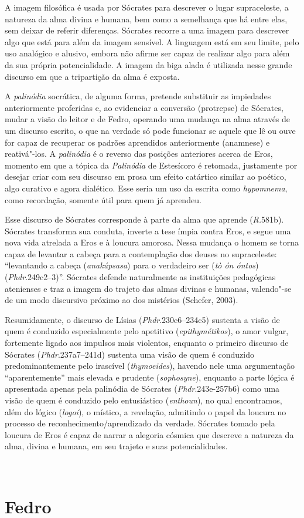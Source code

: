 A imagem filosófica é usada por Sócrates para descrever o lugar
supraceleste, a natureza da alma divina e humana, bem como a semelhança
que há entre elas, sem deixar de referir diferenças. Sócrates recorre a
uma imagem para descrever algo que está para além da imagem sensível. A linguagem está em seu limite, pelo uso analógico e alusivo, embora não
afirme ser capaz de realizar algo para além da sua própria
potencialidade. A imagem da biga alada é utilizada nesse grande discurso
em que a tripartição da alma é exposta.

A \emph{palinódia} socrática, de alguma forma, pretende substituir as
impiedades anteriormente proferidas e, ao evidenciar a conversão
(protrepse) de Sócrates, mudar a visão do leitor e de Fedro, operando
uma mudança na alma através de um discurso escrito, o que na verdade só
pode funcionar se aquele que lê ou ouve for capaz de recuperar os
padrões aprendidos anteriormente (anamnese) e reativá"-los.
A \emph{palinódia} é o reverso das posições anteriores acerca de Eros,
momento em que a tópica da \emph{Palinódia} de Estesícoro é retomada,
justamente por desejar criar com seu discurso em prosa um efeito
catártico similar ao poético, algo curativo e agora dialético. Esse
seria um uso da escrita como \emph{hypomnema}, como recordação, somente
útil para quem já aprendeu.

Esse discurso de Sócrates corresponde à parte da alma que aprende
(\emph{R.}581b). Sócrates transforma sua conduta, inverte a tese ímpia
contra Eros, e segue uma nova vida atrelada a Eros e à loucura amorosa.
Nessa mudança o homem se torna capaz de levantar a cabeça para a
contemplação dos deuses no supraceleste: ``levantando a cabeça
(\emph{anakúpsasa}) para o verdadeiro ser (\emph{tò ón óntos})
(\emph{Phdr}.249c2--3)''. Sócrates defende naturalmente as instituições
pedagógicas atenienses e traz a imagem do trajeto das almas divinas e
humanas, valendo"-se de um modo discursivo próximo ao dos mistérios
(Schefer, 2003).

 

\asterisc{}

 

Resumidamente, o discurso de Lísias (\emph{Phdr}.230e6--234c5) sustenta
a visão de quem é conduzido especialmente pelo apetitivo
(\emph{epithymétikos}), o amor vulgar, fortemente ligado aos impulsos
mais violentos, enquanto o primeiro discurso de Sócrates
(\emph{Phdr}.237a7--241d) sustenta uma visão de quem é conduzido
predominantemente pelo irascível (\emph{thymoeides}), havendo nele uma
argumentação ``aparentemente'' mais elevada e prudente
(\emph{sophosyne}), enquanto a parte lógica é apresentada apenas pela
palinódia de Sócrates (\emph{Phdr}.243e-257b6) como uma visão de quem é
conduzido pelo entusiástico (\emph{enthoun}), no qual encontramos, além
do lógico (\emph{logoi}), o místico, a revelação, admitindo o papel da
loucura no processo de reconhecimento/\allowbreak{}aprendizado da verdade. Sócrates
tomado pela loucura de Eros é capaz de narrar a alegoria cósmica que
descreve a natureza da alma, divina e humana, em seu trajeto e suas
potencialidades.

 



​

\part{Fedro}

 
